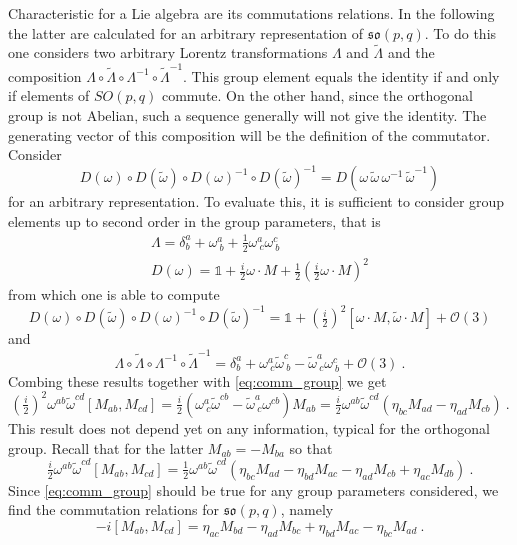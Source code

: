 \documentclass[10pt]{amsart}
\numberwithin{equation}{section}
\begin{document}
Characteristic for a Lie algebra are its commutations relations.  
In the following the latter are calculated for an arbitrary 
representation of $\mathfrak{so}(p,q)$. To do this one considers 
two arbitrary Lorentz transformations $\Lambda$ and 
$\tilde{\Lambda}$ and the composition $\Lambda 
\circ\tilde{\Lambda} \circ\Lambda^{-1} 
\circ\tilde{\Lambda}^{-1}$. This group element equals the 
identity if and only if elements of $SO(p,q)$ commute. On the 
other hand, since the orthogonal group is not Abelian, such a 
sequence generally will not give the identity. The generating 
vector of this composition will be the definition of the 
commutator. Consider%
\begin{equation}\label{eq:comm_group}
	D(\omega) \circ D(\tilde{\omega}) \circ D(\omega)^{-1} \circ 
	D(\tilde{\omega})^{-1} = D(\omega\, \tilde{\omega}\, 
	\omega^{-1}\, \tilde{\omega}^{-1})
\end{equation}
for an arbitrary representation.
To evaluate this, it is sufficient to consider group elements up 
to second order in the group parameters, that is
%
\begin{gather*}
	\Lambda = \delta^a_b + \omega^a_{~b} + \tfrac{1}{2} 
	\omega^a_{~c}\omega^c_{~b} \\
	D(\omega) = \mathbb{1} + \tfrac{i}{2}\omega\cdot M + 
	\tfrac{1}{2}(\tfrac{i}{2}\omega\cdot M)^2
\end{gather*}
from which one is able to compute
%
\begin{displaymath}
	D(\omega) \circ D(\tilde{\omega}) \circ D(\omega)^{-1} \circ 
	D(\tilde{\omega})^{-1} = \mathbb{1} + (\tfrac{i}{2})^2 
	[\omega\cdot M,\tilde{\omega}\cdot M] + \mathcal{O}(3)
\end{displaymath}
and
\begin{displaymath}
	\Lambda \circ\tilde{\Lambda} \circ\Lambda^{-1} 
	\circ\tilde{\Lambda}^{-1} = \delta^a_b + 
	\omega^a_{~c}\tilde{\omega}^c_{~b} - 
	\tilde{\omega}^a_{~c}\omega^c_{~b} + \mathcal{O}(3)~.
\end{displaymath}
Combing these results together with \eqref{eq:comm_group} we get
%
\begin{displaymath}
	(\tfrac{i}{2})^2 \omega^{ab}\tilde{\omega}^{cd}[M_{ab},M_{cd}] 
	= \tfrac{i}{2}( \omega^a_{~c}\tilde{\omega}^{cb} - 
	\tilde{\omega}^a_{~c}\omega^{cb})M_{ab}
	= \tfrac{i}{2}\omega^{ab}\tilde{\omega}^{cd} (\eta_{bc}M_{ad} 
	- \eta_{ad}M_{cb})~.
\end{displaymath}
This result does not depend yet on any information, typical for 
the orthogonal group. Recall that for the latter $M_{ab} = 
-M_{ba}$ so that
%
\begin{displaymath}
	\tfrac{i}{2}\omega^{ab}\tilde{\omega}^{cd}[M_{ab},M_{cd}] = 
	\tfrac{1}{2}\omega^{ab}\tilde{\omega}^{cd} (\eta_{bc}M_{ad} - 
	\eta_{bd}M_{ac} - \eta_{ad}M_{cb} + \eta_{ac}M_{db})~.
\end{displaymath}
Since \eqref{eq:comm_group} should be true for any group 
parameters considered, we find the commutation relations for 
$\mathfrak{so}(p,q)$, namely
%
\begin{equation}\label{eq:comm_rel_so(p,q)}
	-i[M_{ab},M_{cd}] = \eta_{ac}M_{bd} - \eta_{ad}M_{bc} + 
	\eta_{bd}M_{ac} - \eta_{bc}M_{ad}~.
\end{equation}
	
\end{document}

